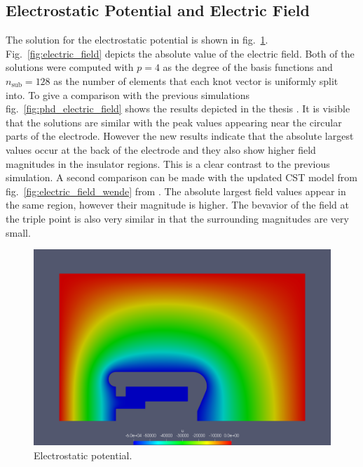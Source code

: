 \subsection{Electrostatic Potential and Electric Field}
\label{sec:potential_field}
The solution for the electrostatic potential is shown in fig.~\ref{fig:potential}. Fig.~\ref{fig:electric_field} depicts the absolute value of the electric field.
Both of the solutions were computed with $p=4$ as the degree of the basis functions and $n_\mathrm{sub}=128$ as the number of elements that each knot vector is uniformly split into.
To give a comparison with the previous simulations fig.~\ref{fig:phd_electric_field} shows the results depicted in the thesis \cite{espig}. It is visible that the solutions are similar with the peak values appearing near the circular parts of the electrode. However the new results indicate that the absolute largest values occur at the back of the electrode and they also show higher field magnitudes in the insulator regions. This is a clear contrast to the previous simulation.
A second comparison can be made with the updated CST model from fig.~\ref{fig:electric_field_wende} from \cite{wende}. The absolute largest field values appear in the same region, however their magnitude is higher.
The bevavior of the field at the triple point is also very similar in that the surrounding magnitudes are very small.

\begin{center}
\begin{figure}[H]
  \includegraphics[width=\textwidth]{figures/60kV/potential}
  \caption{Electrostatic potential.}
  \label{fig:potential}
\end{figure}
\end{center}

